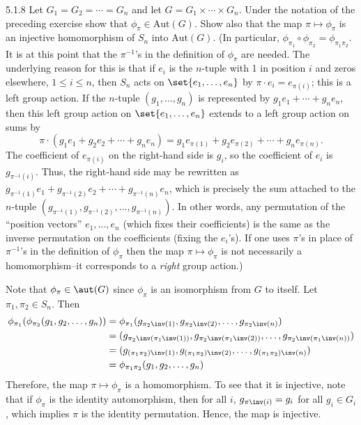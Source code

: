 \begin{exercise}{5.1.8}
    Let $G_1 = G_2 = \cdots = G_n$ and let $G = G_1 \times \cdots \times G_n$.
	Under the notation of the preceding exercise show that $\phi_\pi \in \text{Aut}(G)$.
	Show also that the map $\pi \mapsto \phi_\pi$ is an injective homomorphism of $S_n$ into $\text{Aut}(G)$. (In particular, $\phi_{\pi_1} \circ \phi_{\pi_2} = \phi_{\pi_1 \pi_2}$.
	It is at this point that the $\pi^{-1}$'s in the definition of $\phi_\pi$ are needed.
	The underlying reason for this is that if $e_i$ is the $n$-tuple with 1 in position $i$ and zeros elsewhere, $1 \leq i \leq n$, then $S_n$ acts on $\set{e_1, \ldots, e_n}$ by $\pi \cdot e_i = e_{\pi(i)}$; this is a left group action.
	If the $n$-tuple $(g_1, \ldots, g_n)$ is represented by $g_1 e_1 + \cdots + g_n e_n$, then this left group action on $\set{e_1, \ldots, e_n}$ extends to a left group action on sums by
    \[
    	\pi \cdot (g_1 e_1 + g_2 e_2 + \cdots + g_n e_n) = g_1 e_{\pi(1)} + g_2 e_{\pi(2)} + \cdots + g_n e_{\pi(n)}.
    \]
    The coefficient of $e_{\pi(i)}$ on the right-hand side is $g_i$, so the coefficient of $e_i$ is $g_{\pi^{-1}(i)}$.
	Thus, the right-hand side may be rewritten as $g_{\pi^{-1}(1)} e_1 + g_{\pi^{-1}(2)} e_2 + \cdots + g_{\pi^{-1}(n)} e_n$, which is precisely the sum attached to the $n$-tuple $(g_{\pi^{-1}(1)}, g_{\pi^{-1}(2)}, \ldots, g_{\pi^{-1}(n)})$.
	In other words, any permutation of the ``position vectors'' $e_1, \ldots, e_n$ (which fixes their coefficients) is the same as the inverse permutation on the coefficients (fixing the $e_i$'s).
	If one uses $\pi$'s in place of $\pi^{-1}$'s in the definition of $\phi_\pi$ then the map $\pi \mapsto \phi_\pi$ is not necessarily a homomorphism--it corresponds to a \emph{right} group action.)
\end{exercise}

\begin{sol}
    Note that $\phi_\pi \in \aut(G)$ since $\phi_\pi$ is an isomorphism from $G$ to itself.
	Let $\pi_1, \pi_2 \in S_n$.
	Then
    \begin{align*}
        \phi_{\pi_1}(\phi_{\pi_2}(g_1, g_2, \ldots, g_n)) & = \phi_{\pi_1}(g_{\pi_2\inv(1)}, g_{\pi_2\inv(2)}, \ldots, g_{\pi_2\inv(n)}) \\
        & = (g_{\pi_2\inv(\pi_1\inv(1))}, g_{\pi_2\inv(\pi_1\inv(2))}, \ldots, g_{\pi_2\inv(\pi_1\inv(n))}) \\
        & = (g_{(\pi_1 \pi_2)\inv(1)}, g_{(\pi_1 \pi_2)\inv(2)}, \ldots, g_{(\pi_1 \pi_2)\inv(n)}) \\
        & = \phi_{\pi_1 \pi_2}(g_1, g_2, \ldots, g_n)
    \end{align*}
    Therefore, the map $\pi \mapsto \phi_\pi$ is a homomorphism.
	To see that it is injective, note that if $\phi_\pi$ is the identity automorphism, then for all $i$, $g_{\pi\inv(i)} = g_i$ for all $g_i \in G_i$, which implies $\pi$ is the identity permutation.
	Hence, the map is injective.
\end{sol}


